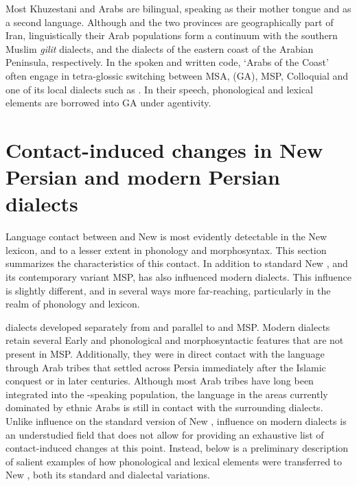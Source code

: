 \documentclass[output=paper]{langsci/langscibook}
\begin{document}
Most Khuzestani and    Arabs are bilingual, speaking  as their mother tongue and  as a second language. Although  and the two   provinces are geographically part of Iran, linguistically their Arab populations form a continuum with the southern  Muslim \textit{gilit}{} dialects, and the dialects of the eastern coast of the Arabian Peninsula, respectively. In the spoken and written code, ‘Arabs of the Coast’ often engage in tetra-glossic switching between MSA,   (GA), MSP, Colloquial  and one of its local dialects such as . In their speech,  phonological and lexical elements are borrowed into GA under  agentivity.

\section{Contact-induced changes in New Persian and modern Persian dialects} \label{dial}
Language contact between  and New  is most evidently detectable in the New  lexicon, and to a lesser extent in phonology and morphosyntax. This section summarizes the characteristics of this contact. In addition to standard New , and its contemporary variant MSP,  has also influenced modern  dialects. This influence is slightly different, and in several ways more far-reaching, particularly in the realm of phonology and lexicon.

 dialects developed separately from and parallel to   and MSP. Modern  dialects retain several Early  and   phonological and morphosyntactic features that are not present in MSP. Additionally, they were in direct contact with the  language through Arab tribes that settled across Persia immediately after the Islamic conquest or in later centuries. Although most Arab tribes have long been integrated into the -speaking population, the  language in the areas currently dominated by ethnic Arabs is still in contact with the surrounding  dialects. Unlike  influence on the standard version of New ,  influence on modern  dialects is an understudied field that does not allow for providing an exhaustive list of contact-induced changes at this point. Instead, below is a preliminary description of salient examples of how  phonological and lexical elements were transferred to New , both its standard and dialectal variations.
\end{document}
